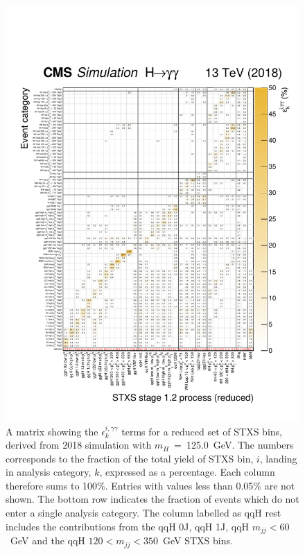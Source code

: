 \begin{figure}[hptb]
  \centering
  \includegraphics[width=1\textwidth]{Figures/hgg_stats/migrationMatrix_2018_thesis.pdf}
  \caption[Efficiency times acceptance matrix from 2018 simulation]
  {
    A matrix showing the $\epsilon^{i,\gamma\gamma}_{k}$ terms for a reduced set of STXS bins, derived from 2018 simulation with $m_H$~=~125.0~GeV. The numbers corresponds to the fraction of the total yield of STXS bin, $i$, landing in analysis category, $k$, expressed as a percentage. Each column therefore sums to 100\%. Entries with values less than 0.05\% are not shown. The bottom row indicates the fraction of events which do not enter a single analysis category. The column labelled as qqH rest includes the contributions from the qqH 0J, qqH 1J, qqH $m_{jj}<60$~GeV and the qqH $120<m_{jj}<350$~GeV STXS bins.
  }
  \label{fig:ea_2018}
\end{figure}

